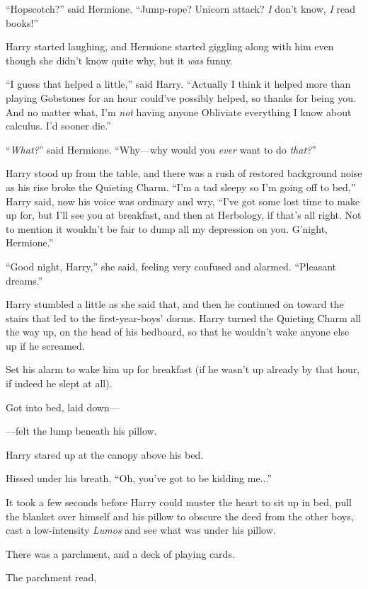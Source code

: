 “Hopscotch?” said Hermione. “Jump-rope? Unicorn attack? \emph{I} don’t know, \emph{I} read books!”

Harry started laughing, and Hermione started giggling along with him even though she didn’t know quite why, but it \emph{was} funny.

“I guess that helped a little,” said Harry. “Actually I think it helped more than playing Gobstones for an hour could’ve possibly helped, so thanks for being you. And no matter what, I’m \emph{not} having anyone Obliviate everything I know about calculus. I’d sooner die.”

“\emph{What?}” said Hermione. “Why—why would you \emph{ever} want to do \emph{that?}”

Harry stood up from the table, and there was a rush of restored background noise as his rise broke the Quieting Charm. “I’m a tad sleepy so I’m going off to bed,” Harry said, now his voice was ordinary and wry, “I’ve got some lost time to make up for, but I’ll see you at breakfast, and then at Herbology, if that’s all right. Not to mention it wouldn’t be fair to dump all my depression on you. G’night, Hermione.”

“Good night, Harry,” she said, feeling very confused and alarmed. “Pleasant dreams.”

Harry stumbled a little as she said that, and then he continued on toward the stairs that led to the first-year-boys’ dorms.
\sbreak
Harry turned the Quieting Charm all the way up, on the head of his bedboard, so that he wouldn’t wake anyone else up if he screamed.

Set his alarm to wake him up for breakfast (if he wasn’t up already by that hour, if indeed he slept at all).

Got into bed, laid down—

—felt the lump beneath his pillow.

Harry stared up at the canopy above his bed.

Hissed under his breath, “Oh, you’ve got to be kidding me...”

It took a few seconds before Harry could muster the heart to sit up in bed, pull the blanket over himself and his pillow to obscure the deed from the other boys, cast a low-intensity \emph{Lumos} and see what was under his pillow.

There was a parchment, and a deck of playing cards.

The parchment read,


